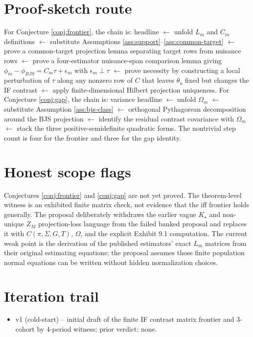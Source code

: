 \documentclass[11pt]{article}
\theoremstyle{definition}
\theoremstyle{plain}
\theoremstyle{remark}
\begin{document}
\section{Proof-sketch route}
For Conjecture \ref{conj:frontier}, the chain is: headline $\leftarrow$ unfold $L_m$ and $C_m$ definitions $\leftarrow$ substitute Assumptions \ref{ass:support}--\ref{ass:common-target} $\leftarrow$ prove a common-target projection lemma separating target rows from nuisance rows $\leftarrow$ prove a four-estimator nuisance-span comparison lemma giving $\phi_m-\phi_{BJS}=C_m\tau+\epsilon_m$ with $\epsilon_m\perp\tau$ $\leftarrow$ prove necessity by constructing a local perturbation of $\tau$ along any nonzero row of $C$ that leaves $\theta_a$ fixed but changes the IF contrast $\leftarrow$ apply finite-dimensional Hilbert projection uniqueness. For Conjecture \ref{conj:gap}, the chain is: variance headline $\leftarrow$ unfold $\Omega_m$ $\leftarrow$ substitute Assumption \ref{ass:bjs-class} $\leftarrow$ orthogonal Pythagorean decomposition around the BJS projection $\leftarrow$ identify the residual contrast covariance with $\Omega_m$ $\leftarrow$ stack the three positive-semidefinite quadratic forms. The nontrivial step count is four for the frontier and three for the gap identity.

\section{Honest scope flags}
Conjectures \ref{conj:frontier} and \ref{conj:gap} are not yet proved. The theorem-level witness is an exhibited finite matrix check, not evidence that the iff frontier holds generally. The proposal deliberately withdraws the earlier vague $K_\star$ and non-unique $Z_M$ projection-loss language from the failed banked proposal and replaces it with $C(\pi,\Sigma,G,T)$, $\Omega$, and the explicit Exhibit 9.1 computation. The current weak point is the derivation of the published estimators' exact $L_m$ matrices from their original estimating equations; the proposal assumes those finite population normal equations can be written without hidden normalization choices.

\section{Iteration trail}
\begin{itemize}[leftmargin=*]
\item v1 (cold-start) -- initial draft of the finite IF contrast matrix frontier and $3$-cohort by $4$-period witness; prior verdict: none.
\end{itemize}
\end{document}
